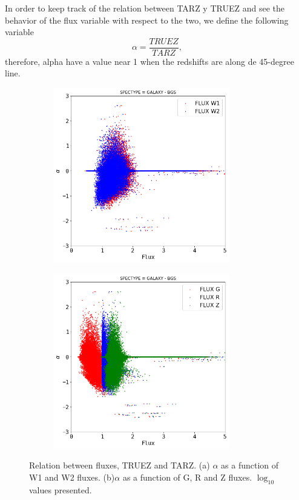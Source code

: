 In order to keep track of the relation between TARZ y TRUEZ and see the behavior of the flux variable with respect to the two, we define the following variable
\begin{equation}
\alpha = \frac{TRUEZ}{TARZ},
\end{equation}
therefore, alpha have a value near 1 when the redshifts are along de 45-degree line. 
\begin{figure}[!htp]
	\centering
	\begin{subfigure}[t]{0.5\textwidth}
		\centering
		\includegraphics[height=3in]{TeX_files/Imagenes/BGS-FLUXW-ALPHA}
		\caption{}
	\end{subfigure}%
	\begin{subfigure}[t]{0.5\textwidth}
		\centering
		\includegraphics[height=3in]{TeX_files/Imagenes/BGS-FLUXRGZ-ALPHA}
		\caption{}
	\end{subfigure}
	\caption{Relation between fluxes, TRUEZ and TARZ. (a) $\alpha$ as a function of W1 and W2 fluxes. (b)$\alpha$ as a function of G, R and Z fluxes. $\log_{10}$ values presented.}
	\label{fig:BGS-FLUX-ALPHA}
\end{figure} 

